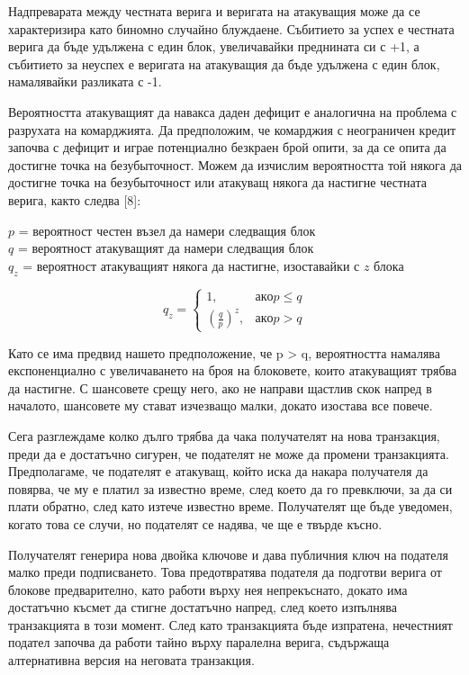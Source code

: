 \documentclass[11pt,a4paper]{article}
\begin{document}
Надпреварата между честната верига и веригата на атакуващия може да се характеризира като биномно случайно блуждаене. Събитието за успех е честната верига да бъде удължена с един блок, увеличавайки преднината си с +1, а събитието за неуспех е веригата на атакуващия да бъде удължена с един блок, намалявайки разликата с -1.

Вероятността атакуващият да навакса даден дефицит е аналогична на проблема с разрухата на комарджията. Да предположим, че комарджия с неограничен кредит започва с дефицит и играе потенциално безкраен брой опити, за да се опита да достигне точка на безубыточност. Можем да изчислим вероятността той някога да достигне точка на безубыточност или атакуващ някога да настигне честната верига, както следва [8]:

$p$ = вероятност честен възел да намери следващия блок\\
$q$ = вероятност атакуващият да намери следващия блок\\
$q_z$ = вероятност атакуващият някога да настигне, изоставайки с $z$ блока

$$
q_z =
\begin{cases}
	1, & \mathrm{ако } p \leq q \\
	\left(\frac{q}{p}\right)^z, & \mathrm{ако } p > q
\end{cases}
$$

Като се има предвид нашето предположение, че p > q, вероятността намалява експоненциално с увеличаването на броя на блоковете, които атакуващият трябва да настигне. С шансовете срещу него, ако не направи щастлив скок напред в началото, шансовете му стават изчезващо малки, докато изостава все повече.

Сега разглеждаме колко дълго трябва да чака получателят на нова транзакция, преди да е достатъчно сигурен, че подателят не може да промени транзакцията. Предполагаме, че подателят е атакуващ, който иска да накара получателя да повярва, че му е платил за известно време, след което да го превключи, за да си плати обратно, след като изтече известно време. Получателят ще бъде уведомен, когато това се случи, но подателят се надява, че ще е твърде късно.

Получателят генерира нова двойка ключове и дава публичния ключ на подателя малко преди подписването. Това предотвратява подателя да подготви верига от блокове предварително, като работи върху нея непрекъснато, докато има достатъчно късмет да стигне достатъчно напред, след което изпълнява транзакцията в този момент. След като транзакцията бъде изпратена, нечестният подател започва да работи тайно върху паралелна верига, съдържаща алтернативна версия на неговата транзакция.
\end{document}
